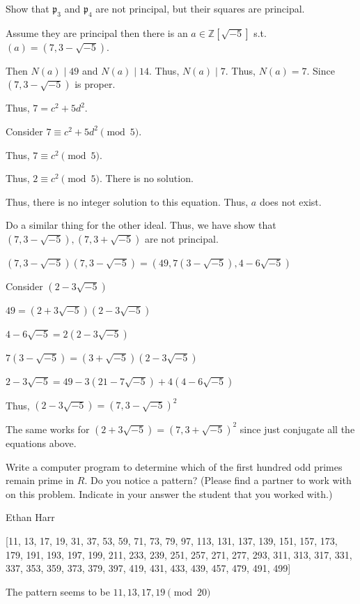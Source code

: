 \documentclass[12pt, letterpaper]{article}
\newcommand{\Z}{\mathbb{Z}}
\begin{document}
\begin{subproblem}{}
    Show that $\mathfrak{p}_3$ and $\mathfrak{p}_4$ are not principal, but their
squares are principal.
\end{subproblem}
\begin{problemproof}
    Assume they are principal then there is an $a \in \Z[\sqrt{-5}]$ s.t. $(a)=(7,3-\sqrt{-5})$.

    Then $N(a) \mid 49$ and $N(a) \mid 14$. Thus, $N(a) \mid 7$. Thus, $N(a)=7$. Since $(7,3-\sqrt{-5})$ is proper.

    Thus, $7=c^2+5d^2$.

    Consider $7 \equiv c^2+5d^2 \pmod{5}$. 
    
    Thus, $7 \equiv c^2 \pmod{5}$. 
    
    Thus, $2 \equiv c^2 \pmod{5}$. There is no solution. 
    
    Thus, there is no integer solution to this equation. Thus, $a$ does not exist.

    Do a similar thing for the other ideal. Thus, we have show that $(7,3-\sqrt{-5}),(7,3+\sqrt{-5})$ are not principal.

    $(7,3-\sqrt{-5})(7,3-\sqrt{-5})=(49,7(3-\sqrt{-5}),4-6\sqrt{-5})$

    Consider $(2-3\sqrt{-5})$

    $49=(2+3\sqrt{-5})(2-3\sqrt{-5})$
    
    $4-6\sqrt{-5}=2(2-3\sqrt{-5})$

    $7(3-\sqrt{-5})=(3+\sqrt{-5})(2-3\sqrt{-5})$

    $2-3\sqrt{-5}=49-3(21-7\sqrt{-5})+4(4-6\sqrt{-5})$

    Thus, $(2-3\sqrt{-5})=(7,3-\sqrt{-5})^2$

    The same works for $(2+3\sqrt{-5})=(7,3+\sqrt{-5})^2$ since just conjugate all the equations above.
\end{problemproof}

\begin{subproblem}{}
    Write a computer program to determine which of the first hundred
odd primes remain prime in $R$. Do you notice a pattern? (Please find a partner to
work with on this problem.
Indicate in your answer the student that you worked with.)
\end{subproblem}
\begin{problemproof}
    Ethan Harr
    
    [11, 13, 17, 19, 31, 37, 53, 59, 71, 73, 79, 97, 113, 131, 137, 139, 151, 157, 173, 179, 191, 193, 197, 199, 211, 233, 239, 251, 257, 271, 277, 293, 311, 313, 317, 331, 337, 353, 359, 373, 379, 397, 419, 431, 433, 439, 457, 479, 491, 499]

    The pattern seems to be $11,13,17,19 \pmod{20}$
\end{problemproof}
\end{document}
